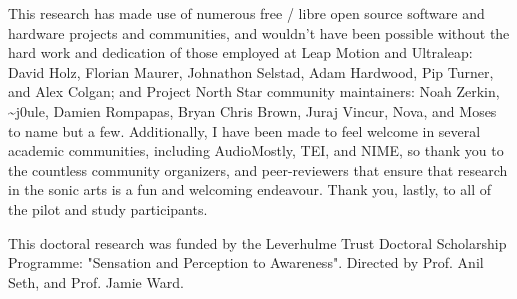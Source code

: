 This research has made use of numerous free / libre open source software and hardware projects and communities, and wouldn't have been possible without the hard work and dedication of those employed at Leap Motion and Ultraleap: David Holz, Florian Maurer, Johnathon Selstad, Adam Hardwood, Pip Turner, and Alex Colgan; and Project North Star community maintainers: Noah Zerkin, \textasciitilde{}j0ule, Damien Rompapas, Bryan Chris Brown, Juraj Vincur, Nova, and Moses to name but a few. Additionally, I have been made to feel welcome in several academic communities, including AudioMostly, TEI, and NIME, so thank you to the countless community organizers, and peer-reviewers that ensure that research in the sonic arts is a fun and welcoming endeavour. Thank you, lastly, to all of the pilot and study participants.

This doctoral research was funded by the Leverhulme Trust Doctoral Scholarship Programme: "Sensation and Perception to Awareness". Directed by Prof. Anil Seth, and Prof. Jamie Ward.
